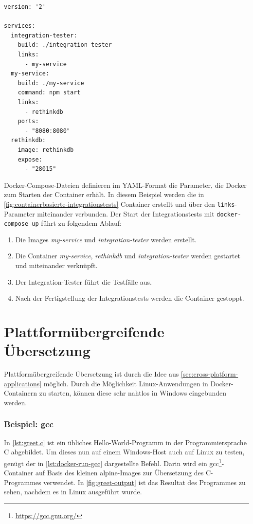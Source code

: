 \begin{lstlisting}[caption=Servicedefinition zum Integrationstesten (docker-compose-yml), label=lst:docker-compose-integrationstests]
version: '2'

services:
  integration-tester:
    build: ./integration-tester
    links:
      - my-service
  my-service:
    build: ./my-service
    command: npm start
    links:
      - rethinkdb
    ports:
      - "8080:8080"
  rethinkdb:
    image: rethinkdb
    expose:
      - "28015"
\end{lstlisting}
Docker-Compose-Dateien definieren im YAML-Format die Parameter, die Docker zum Starten der Container erhält.
In diesem Beispiel werden die in \cref{fig:containerbasierte-integrationstests} Container erstellt und über den \texttt{links}-Parameter miteinander verbunden.
Der Start der Integrationstests mit \texttt{docker-compose up} führt zu folgendem Ablauf:
\begin{enumerate}
    \item Die Images \emph{my-service} und \emph{integration-tester} werden erstellt.
    \item Die Container \emph{my-service}, \emph{rethinkdb} und \emph{integration-tester} werden gestartet und miteinander verknüpft.
    \item Der Integration-Tester führt die Testfälle aus.
    \item Nach der Fertigstellung der Integrationstests werden die Container gestoppt.
\end{enumerate}

\section{Plattformübergreifende Übersetzung}
\label{sec:plattformuebergreifende-uebersetzung}
Plattformübergreifende Übersetzung ist durch die Idee aus \cref{sec:cross-platform-applications} möglich.
Durch die Möglichkeit Linux-Anwendungen in Docker-Containern zu starten, können diese sehr nahtlos in Windows eingebunden werden.

\subsubsection{Beispiel: gcc}
In \cref{lst:greet.c} ist ein übliches Hello-World-Programm in der Programmiersprache C abgebildet.
Um dieses nun auf einem Windows-Host auch auf Linux zu testen, genügt der in \cref{lst:docker-run-gcc} dargestellte Befehl.
Darin wird ein gcc\footnote{\url{https://gcc.gnu.org/}}-Container auf Basis des kleinen alpine-Images zur Übersetzung des C-Programmes verwendet.
In \cref{fig:greet-output} ist das Resultat des Programmes zu sehen, nachdem es in Linux ausgeführt wurde.

